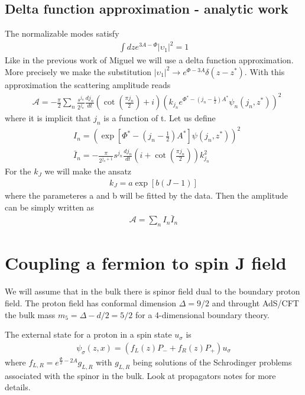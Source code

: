 \documentclass[12pt,a4paper]{article}
\begin{document}
\subsection{Delta function approximation - analytic work}
The normalizable modes satisfy
\begin{align}
    \int dz e^{3 A - \Phi} {|\upsilon_1|}^2 = 1
\end{align}
Like in the previous work of Miguel we will use a delta function approximation.
More precisely we make the substitution ${|\upsilon_1|}^2 \rightarrow e^{\Phi - 3 A} \delta \left( z - z^{*} \right)$.
With this approximation the scattering amplitude reads
\begin{align}
    & \mathcal{A} = - \frac{\pi}{2} \sum_n \frac{s^{j_n}}{2^{j_n}} \frac{d j_n}{d t}\left( \cot\left(\frac{\pi j_n}{2}\right) + i\right) {\left(k_{j_n} e^{\Phi^{*}-\left( j_n - \frac{1}{2} \right)A^{*}} \psi_n \left(j_n, z^{*} \right)\right)}^2
\end{align}
where it is implicit that $j_n$ is a function of t. Let us define
\begin{align}
    & I_n = {\left( \exp\left[\Phi^{*} - \left( j_n - \frac{1}{2} \right) A^{*}\right] \psi \left(j_n, z^{*} \right) \right)}^2 \\
    & \bar{I}_n = - \frac{\pi}{2^{j_n + 1}} s^{j_n} \frac{d j_n}{dt} \left( i + \cot \left( \frac{\pi j_n}{2} \right) \right) k_{j_n}^2
\end{align}
For the $k_J$ we will make the ansatz
\begin{align}
    k_J = a \exp \left[b \left(J - 1 \right)\right]
\end{align}
where the parameteres a and b will be fitted by the data.
Then the amplitude can be simply written as
\begin{align}
    \mathcal{A} = \sum_n I_n \bar{I}_n
\end{align}

\section{Coupling a fermion to spin J field}
We will assume that in the bulk there is spinor field dual to the boundary proton field. The proton field has conformal dimension $\Delta = 9 / 2$ and throught AdS/CFT the bulk mass $m_5 = \Delta - d / 2 = 5 / 2$ for a 4-dimensional boundary theory.

The external state for a proton in a spin state $u_\sigma$ is
\begin{align}
    \psi_\sigma \left( z, x\right) = \left( f_L \left(z\right) P_{-} + f_R \left(z\right) P_{+}\right) u_\sigma
\end{align}
where $f_{L,R} = e^{\frac{\Phi}{2} - 2 A} g_{L,R}$ with $g_{L,R}$ being solutions of the Schrodinger problems associated with the spinor in the bulk. Look at propagators notes for more details.
\end{document}
